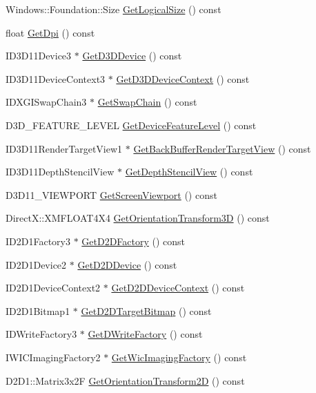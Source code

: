 \begin{DoxyCompactItemize}
\item 
Windows\+::\+Foundation\+::\+Size \hyperlink{class_d_x_1_1_device_resources_a2cf3895fe7f74f4b268d8478da492001}{Get\+Logical\+Size} () const
\item 
float \hyperlink{class_d_x_1_1_device_resources_af313814dc56d14afe8b1a02ba10d462d}{Get\+Dpi} () const
\item 
I\+D3\+D11\+Device3 $\ast$ \hyperlink{class_d_x_1_1_device_resources_aff06b3dbc3a678c38973d9b14cab98b4}{Get\+D3\+D\+Device} () const
\item 
I\+D3\+D11\+Device\+Context3 $\ast$ \hyperlink{class_d_x_1_1_device_resources_a5e9140bef766802bc08d79c1a2f422ca}{Get\+D3\+D\+Device\+Context} () const
\item 
I\+D\+X\+G\+I\+Swap\+Chain3 $\ast$ \hyperlink{class_d_x_1_1_device_resources_a5e27287ddca8d021c5ccefd46e440bea}{Get\+Swap\+Chain} () const
\item 
D3\+D\+\_\+\+F\+E\+A\+T\+U\+R\+E\+\_\+\+L\+E\+V\+EL \hyperlink{class_d_x_1_1_device_resources_a2fcb785972e693d3d8cb711a09cb9f1e}{Get\+Device\+Feature\+Level} () const
\item 
I\+D3\+D11\+Render\+Target\+View1 $\ast$ \hyperlink{class_d_x_1_1_device_resources_ac76b0cfbc12336b39122878c0b875af7}{Get\+Back\+Buffer\+Render\+Target\+View} () const
\item 
I\+D3\+D11\+Depth\+Stencil\+View $\ast$ \hyperlink{class_d_x_1_1_device_resources_a1d9c271bdc8163ee77a175e305fbfb88}{Get\+Depth\+Stencil\+View} () const
\item 
D3\+D11\+\_\+\+V\+I\+E\+W\+P\+O\+RT \hyperlink{class_d_x_1_1_device_resources_aaaadbe1b6ab02879f493914d4440c0c6}{Get\+Screen\+Viewport} () const
\item 
Direct\+X\+::\+X\+M\+F\+L\+O\+A\+T4\+X4 \hyperlink{class_d_x_1_1_device_resources_aaedd593f914988c1aee0712ada59032b}{Get\+Orientation\+Transform3D} () const
\item 
I\+D2\+D1\+Factory3 $\ast$ \hyperlink{class_d_x_1_1_device_resources_a5ccb7b47646cb49a58051ef6b0b90614}{Get\+D2\+D\+Factory} () const
\item 
I\+D2\+D1\+Device2 $\ast$ \hyperlink{class_d_x_1_1_device_resources_a95a773d012e00d4fc6c62ee8b09324a9}{Get\+D2\+D\+Device} () const
\item 
I\+D2\+D1\+Device\+Context2 $\ast$ \hyperlink{class_d_x_1_1_device_resources_a214cafc8d9a6b7bad7394c2a2270aff6}{Get\+D2\+D\+Device\+Context} () const
\item 
I\+D2\+D1\+Bitmap1 $\ast$ \hyperlink{class_d_x_1_1_device_resources_a249227733502bf12f78c2e43875583ee}{Get\+D2\+D\+Target\+Bitmap} () const
\item 
I\+D\+Write\+Factory3 $\ast$ \hyperlink{class_d_x_1_1_device_resources_a12dd3a477131220352b1ade8808d5704}{Get\+D\+Write\+Factory} () const
\item 
I\+W\+I\+C\+Imaging\+Factory2 $\ast$ \hyperlink{class_d_x_1_1_device_resources_a1f299821812c1943c0230903e0500e39}{Get\+Wic\+Imaging\+Factory} () const
\item 
D2\+D1\+::\+Matrix3x2F \hyperlink{class_d_x_1_1_device_resources_a428f59800d7616836359026496d901f9}{Get\+Orientation\+Transform2D} () const
\end{DoxyCompactItemize}



